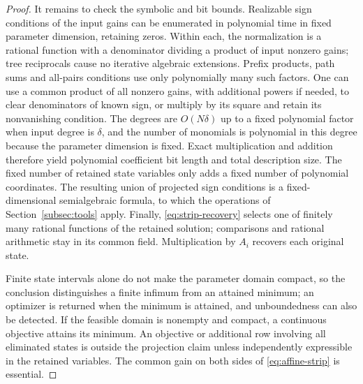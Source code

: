 \begin{proof}
It remains to check the symbolic and bit bounds. Realizable sign conditions
of the input gains can be enumerated in polynomial time in fixed parameter
dimension, retaining zeros. Within each, the normalization is a rational
function with a denominator dividing a product of input nonzero gains; tree
reciprocals cause no iterative algebraic extensions. Prefix products, path
sums and all-pairs conditions use only polynomially many such factors.
One can use a common product of all nonzero gains, with additional powers if
needed, to clear denominators of known sign, or multiply by its square and
retain its nonvanishing condition. The degrees are \(O(N\delta)\) up to a
fixed polynomial factor when input degree is \(\delta\), and the number of
monomials is polynomial in this degree because the parameter dimension is
fixed. Exact multiplication and addition therefore yield polynomial coefficient
bit length and total description size. The fixed number of retained state
variables only adds a fixed number of polynomial coordinates. The resulting
union of projected sign conditions is a fixed-dimensional semialgebraic
formula, to which the operations of Section~\ref{subsec:tools} apply.
Finally, \eqref{eq:strip-recovery} selects one of finitely many rational functions
of the retained solution; comparisons and rational arithmetic stay in its
common field. Multiplication by \(A_i\) recovers each original state.

Finite state intervals alone do not make the parameter domain compact, so
the conclusion distinguishes a finite infimum from an attained minimum; an
optimizer is returned when the minimum is attained, and unboundedness can also
be detected. If the feasible domain is nonempty and compact, a continuous objective
attains its minimum. An objective or additional row involving all eliminated
states is outside the projection claim unless independently expressible in the
retained variables. The common gain on both sides of
\eqref{eq:affine-strip} is essential.
\end{proof}
